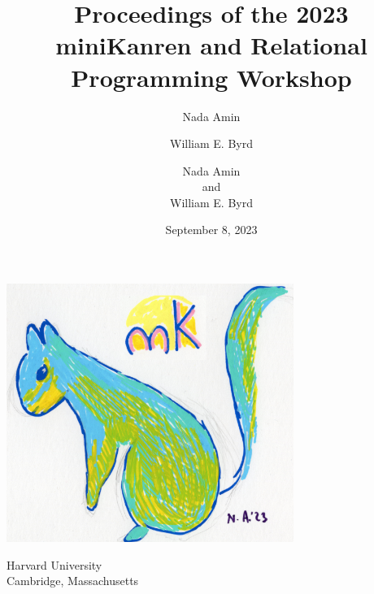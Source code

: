 \documentclass[a4paper]{book}
\date{September 8, 2023}
\author{Nada Amin \and William E. Byrd}
\begin{document}
\frontmatter
\setcounter{page}{3}  %

\title{\vspace{-3cm}Proceedings of the 2023 miniKanren and Relational Programming Workshop}
\author{Nada Amin \\ and \\ William E. Byrd}
\date{}

\begin{titlepage}
  \centering
  \vspace*{4cm}
  
  {\LARGE \thetitle}
  
  \vspace{1.5cm}
  
  {\large \theauthor}
  
  
  
  \vspace{1cm}
  
  \includegraphics[width=0.7\textwidth]{mklogo.png}
  
  \vspace{1cm}
  
  
  
  
  
  

  {\large
    Harvard University \\
    Cambridge, Massachusetts}
  
  \vfill
\end{titlepage}
\end{document}
